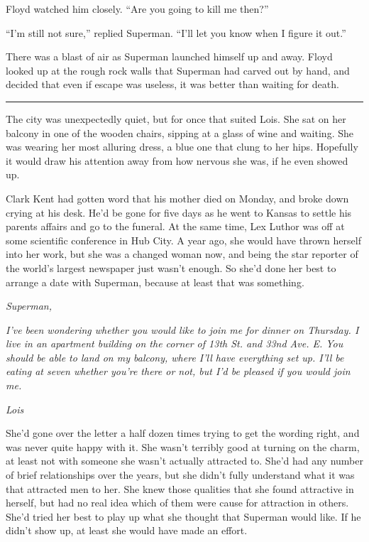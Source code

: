 Floyd watched him closely. ``Are you going to kill me then?''

``I'm still not sure,'' replied Superman. ``I'll let you know when I
figure it out.''

There was a blast of air as Superman launched himself up and away. Floyd
looked up at the rough rock walls that Superman had carved out by hand,
and decided that even if escape was useless, it was better than waiting
for death.

\begin{center}\rule{0.5\linewidth}{\linethickness}\end{center}

The city was unexpectedly quiet, but for once that suited Lois. She sat
on her balcony in one of the wooden chairs, sipping at a glass of wine
and waiting. She was wearing her most alluring dress, a blue one that
clung to her hips. Hopefully it would draw his attention away from how
nervous she was, if he even showed up.

Clark Kent had gotten word that his mother died on Monday, and broke
down crying at his desk. He'd be gone for five days as he went to Kansas
to settle his parents affairs and go to the funeral. At the same time,
Lex Luthor was off at some scientific conference in Hub City. A year
ago, she would have thrown herself into her work, but she was a changed
woman now, and being the star reporter of the world's largest newspaper
just wasn't enough. So she'd done her best to arrange a date with
Superman, because at least that was something.

\emph{Superman,}

\emph{I've been wondering whether you would like to join me for dinner
on Thursday. I live in an apartment building on the corner of 13th St.
and 33nd Ave. E. You should be able to land on my balcony, where I'll
have everything set up. I'll be eating at seven whether you're there or
not, but I'd be pleased if you would join me.}

\emph{Lois}

She'd gone over the letter a half dozen times trying to get the wording
right, and was never quite happy with it. She wasn't terribly good at
turning on the charm, at least not with someone she wasn't actually
attracted to. She'd had any number of brief relationships over the
years, but she didn't fully understand what it was that attracted men to
her. She knew those qualities that she found attractive in herself, but
had no real idea which of them were cause for attraction in others.
She'd tried her best to play up what she thought that Superman would
like. If he didn't show up, at least she would have made an effort.

